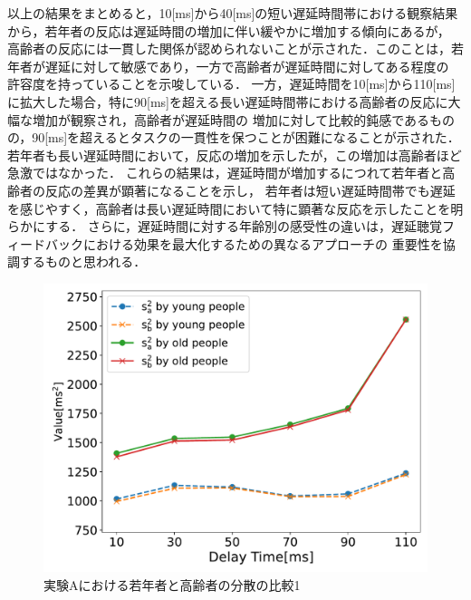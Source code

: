 以上の結果をまとめると，10[ms]から40[ms]の短い遅延時間帯における観察結果から，若年者の反応は遅延時間の増加に伴い緩やかに増加する傾向にあるが，
高齢者の反応には一貫した関係が認められないことが示された．このことは，若年者が遅延に対して敏感であり，一方で高齢者が遅延時間に対してある程度の
許容度を持っていることを示唆している．
一方，遅延時間を10[ms]から110[ms]に拡大した場合，特に90[ms]を超える長い遅延時間帯における高齢者の反応に大幅な増加が観察され，高齢者が遅延時間の
増加に対して比較的鈍感であるものの，90[ms]を超えるとタスクの一貫性を保つことが困難になることが示された．
若年者も長い遅延時間において，反応の増加を示したが，この増加は高齢者ほど急激ではなかった．
これらの結果は，遅延時間が増加するにつれて若年者と高齢者の反応の差異が顕著になることを示し，
若年者は短い遅延時間帯でも遅延を感じやすく，高齢者は長い遅延時間において特に顕著な反応を示したことを明らかにする．
さらに，遅延時間に対する年齢別の感受性の違いは，遅延聴覚フィードバックにおける効果を最大化するための異なるアプローチの
重要性を協調するものと思われる．
\begin{figure}[tbp]
  \centering
  \includegraphics[scale=0.5]{figures/Honbann/Comparison_young_old/110_var_SaSb.pdf}
  \caption{実験Aにおける若年者と高齢者の分散の比較1}
  \label{fig:Var_110ms_Sa_Sb}
\end{figure}
